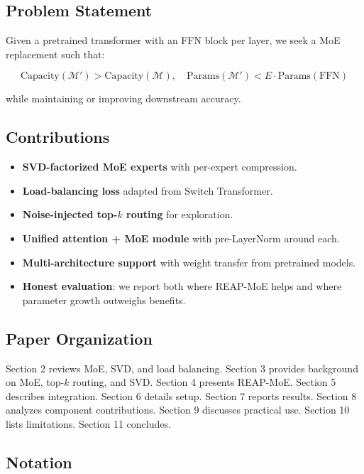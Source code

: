 \subsection{Problem Statement}

Given a pretrained transformer with an FFN block per layer, we seek a MoE 
replacement such that:

\[
\text{Capacity}(\mathcal{M}') > \text{Capacity}(\mathcal{M}), \quad
\text{Params}(\mathcal{M}') < E \cdot \text{Params}(\text{FFN})
\tag{1.1}
\]

while maintaining or improving downstream accuracy.

\subsection{Contributions}

\begin{itemize}
\item \textbf{SVD-factorized MoE experts} with per-expert compression.
\item \textbf{Load-balancing loss} adapted from Switch Transformer.
\item \textbf{Noise-injected top-$k$ routing} for exploration.
\item \textbf{Unified attention + MoE module} with pre-LayerNorm around each.
\item \textbf{Multi-architecture support} with weight transfer from pretrained models.
\item \textbf{Honest evaluation}: we report both where REAP-MoE helps and where
  parameter growth outweighs benefits.

\end{itemize}
\subsection{Paper Organization}

Section 2 reviews MoE, SVD, and load balancing. Section 3 provides background 
on MoE, top-$k$ routing, and SVD. Section 4 presents REAP-MoE. Section 5 
describes integration. Section 6 details setup. Section 7 reports results. 
Section 8 analyzes component contributions. Section 9 discusses practical 
use. Section 10 lists limitations. Section 11 concludes.



\subsection{Notation}

